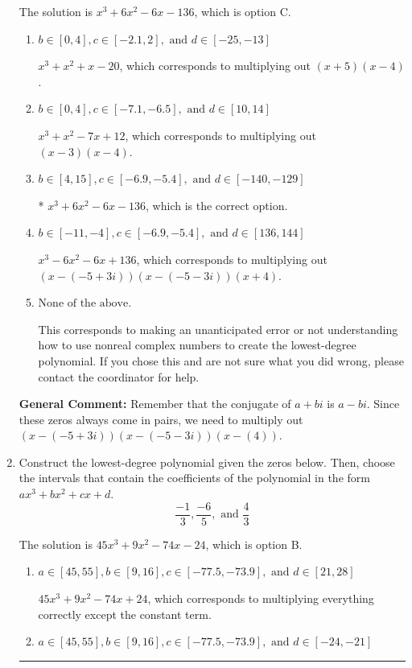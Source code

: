 \documentclass{extbook}[14pt]
\newcommand{\litem}[1]{\item #1

\rule{\textwidth}{0.4pt}}
\begin{document}
\begin{enumerate}
{The solution is \( x^{3} +6 x^{2} -6 x -136 \), which is option C.\begin{enumerate}[label=\Alph*.]
\item \( b \in [0, 4], c \in [-2.1, 2], \text{ and } d \in [-25, -13] \)

$x^{3} + x^{2} +x -20$, which corresponds to multiplying out $(x + 5)(x -4)$.
\item \( b \in [0, 4], c \in [-7.1, -6.5], \text{ and } d \in [10, 14] \)

$x^{3} + x^{2} -7 x + 12$, which corresponds to multiplying out $(x -3)(x -4)$.
\item \( b \in [4, 15], c \in [-6.9, -5.4], \text{ and } d \in [-140, -129] \)

* $x^{3} +6 x^{2} -6 x -136$, which is the correct option.
\item \( b \in [-11, -4], c \in [-6.9, -5.4], \text{ and } d \in [136, 144] \)

$x^{3} -6 x^{2} -6 x + 136$, which corresponds to multiplying out $(x-(-5 + 3 i))(x-(-5 - 3 i))(x + 4)$.
\item \( \text{None of the above.} \)

This corresponds to making an unanticipated error or not understanding how to use nonreal complex numbers to create the lowest-degree polynomial. If you chose this and are not sure what you did wrong, please contact the coordinator for help.
\end{enumerate}

\textbf{General Comment:} Remember that the conjugate of $a+bi$ is $a-bi$. Since these zeros always come in pairs, we need to multiply out $(x-(-5 + 3 i))(x-(-5 - 3 i))(x-(4))$.
}
\litem{
Construct the lowest-degree polynomial given the zeros below. Then, choose the intervals that contain the coefficients of the polynomial in the form $ax^3+bx^2+cx+d$.
\[ \frac{-1}{3}, \frac{-6}{5}, \text{ and } \frac{4}{3} \]

The solution is \( 45x^{3} +9 x^{2} -74 x -24 \), which is option B.\begin{enumerate}[label=\Alph*.]
\item \( a \in [45, 55], b \in [9, 16], c \in [-77.5, -73.9], \text{ and } d \in [21, 28] \)

$45x^{3} +9 x^{2} -74 x + 24$, which corresponds to multiplying everything correctly except the constant term.
\item \( a \in [45, 55], b \in [9, 16], c \in [-77.5, -73.9], \text{ and } d \in [-24, -21] \)


\end{enumerate}}
\end{enumerate}
\end{document}
